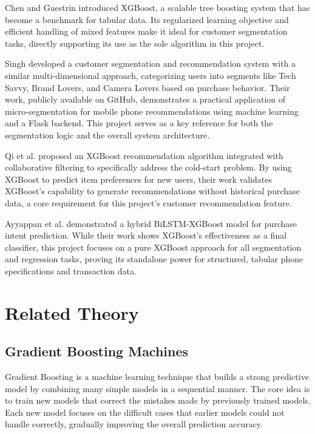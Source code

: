 \documentclass[12pt, a4paper]{report}
\numberwithin{equation}{chapter}
\begin{document}
Chen and Guestrin \cite{chen} introduced XGBoost, a scalable tree boosting system that has become a benchmark for tabular data. Its regularized learning objective and efficient handling of mixed features make it ideal for customer segmentation tasks, directly supporting its use as the sole algorithm in this project.

Singh \cite{singh} developed a customer segmentation and recommendation system with a similar multi-dimensional approach, categorizing users into segments like Tech Savvy, Brand Lovers, and Camera Lovers based on purchase behavior. Their work, publicly available on GitHub, demonstrates a practical application of micro-segmentation for mobile phone recommendations using machine learning and a Flask backend. This project serves as a key reference for both the segmentation logic and the overall system architecture.

Qi et al. \cite{qi} proposed an XGBoost recommendation algorithm integrated with collaborative filtering to specifically address the cold-start problem. By using XGBoost to predict item preferences for new users, their work validates XGBoost's capability to generate recommendations without historical purchase data, a core requirement for this project's customer recommendation feature.

Ayyappan et al. \cite{ayyappan} demonstrated a hybrid BiLSTM-XGBoost model for purchase intent prediction. While their work shows XGBoost's effectiveness as a final classifier, this project focuses on a pure XGBoost approach for all segmentation and regression tasks, proving its standalone power for structured, tabular phone specifications and transaction data.

\section{Related Theory}

\subsection{Gradient Boosting Machines}

Gradient Boosting is a machine learning technique that builds a strong predictive model by combining many simple models in a sequential manner. The core idea is to train new models that correct the mistakes made by previously trained models. Each new model focuses on the difficult cases that earlier models could not handle correctly, gradually improving the overall prediction accuracy.
\end{document}
